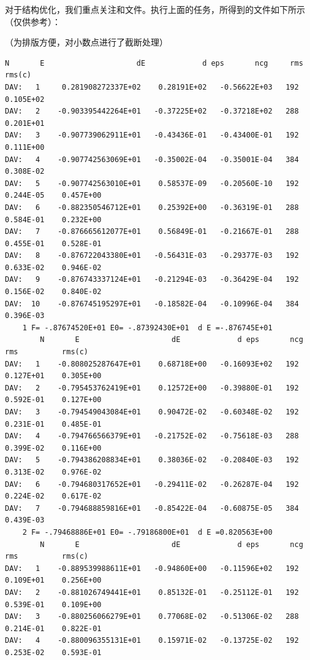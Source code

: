 对于结构优化，我们重点关注和文件。执行上面的任务，所得到的文件如下所示（仅供参考）：

（为排版方便，对小数点进行了截断处理）

\begin{lstlisting}[caption=OSZICAR,basicstyle=\tiny]
        N       E                     dE             d eps       ncg     rms          rms(c)
DAV:   1     0.281908272337E+02    0.28191E+02   -0.56622E+03   192   0.105E+02
DAV:   2    -0.903395442264E+01   -0.37225E+02   -0.37218E+02   288   0.201E+01
DAV:   3    -0.907739062911E+01   -0.43436E-01   -0.43400E-01   192   0.111E+00
DAV:   4    -0.907742563069E+01   -0.35002E-04   -0.35001E-04   384   0.308E-02
DAV:   5    -0.907742563010E+01    0.58537E-09   -0.20560E-10   192   0.244E-05    0.457E+00
DAV:   6    -0.882350546712E+01    0.25392E+00   -0.36319E-01   288   0.584E-01    0.232E+00
DAV:   7    -0.876665612077E+01    0.56849E-01   -0.21667E-01   288   0.455E-01    0.528E-01
DAV:   8    -0.876722043380E+01   -0.56431E-03   -0.29377E-03   192   0.633E-02    0.946E-02
DAV:   9    -0.876743337124E+01   -0.21294E-03   -0.36429E-04   192   0.156E-02    0.840E-02
DAV:  10    -0.876745195297E+01   -0.18582E-04   -0.10996E-04   384   0.396E-03
    1 F= -.87674520E+01 E0= -.87392430E+01  d E =-.876745E+01
        N       E                     dE             d eps       ncg     rms          rms(c)
DAV:   1    -0.808025287647E+01    0.68718E+00   -0.16093E+02   192   0.127E+01    0.305E+00
DAV:   2    -0.795453762419E+01    0.12572E+00   -0.39880E-01   192   0.592E-01    0.127E+00
DAV:   3    -0.794549043084E+01    0.90472E-02   -0.60348E-02   192   0.231E-01    0.485E-01
DAV:   4    -0.794766566379E+01   -0.21752E-02   -0.75618E-03   288   0.399E-02    0.116E+00
DAV:   5    -0.794386208834E+01    0.38036E-02   -0.20840E-03   192   0.313E-02    0.976E-02
DAV:   6    -0.794680317652E+01   -0.29411E-02   -0.26287E-04   192   0.224E-02    0.617E-02
DAV:   7    -0.794688859816E+01   -0.85422E-04   -0.60875E-05   384   0.439E-03
    2 F= -.79468886E+01 E0= -.79186800E+01  d E =0.820563E+00
        N       E                     dE             d eps       ncg     rms          rms(c)
DAV:   1    -0.889539988611E+01   -0.94860E+00   -0.11596E+02   192   0.109E+01    0.256E+00
DAV:   2    -0.881026749441E+01    0.85132E-01   -0.25112E-01   192   0.539E-01    0.109E+00
DAV:   3    -0.880256066279E+01    0.77068E-02   -0.51306E-02   288   0.214E-01    0.822E-01
DAV:   4    -0.880096355131E+01    0.15971E-02   -0.13725E-02   192   0.253E-02    0.593E-01

\end{lstlisting}
